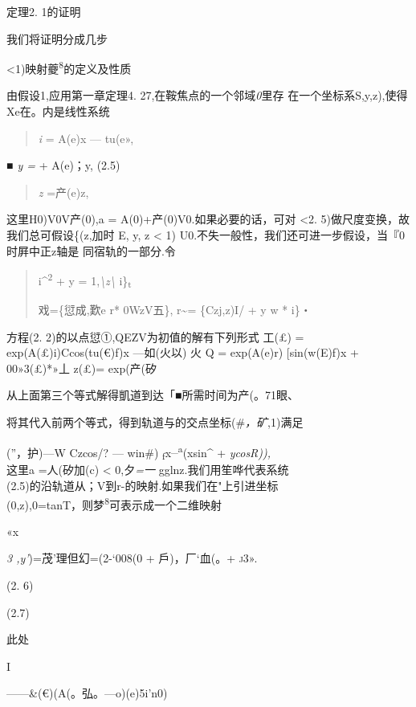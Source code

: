\documentclass{article}
\begin{document}
定理2. 1的证明

我们将证明分成几步

\textless{}1)映射夔\textsuperscript{8}的定义及性质

由假设1,应用第一章定理4. 27,在鞍焦点的一个邻域\emph{0}里存
在一个坐标系S,y,z),使得Xe在。内是线性系统

\begin{quote}
\emph{i} = A(e)x --- tu(e»,
\end{quote}

\emph{■ y =} + A(e)；y, (2.5)

\begin{quote}
\emph{z} =产(e)z,
\end{quote}

这里H0)V0V产(0),a = A(0)+产(0)V0.如果必要的话，可对 \textless{}2.
5)做尺度变换，故我们总可假设\{(z,加时\textbar{} E\textbar{},
\textbar{}y\textbar{}, \textbar{}z\textbar{} \textless{} 1)
U0.不失一般性，我们还可进一步假设，当『0时屛中正z轴是 同宿轨的一部分.令

\begin{quote}
i\^{}\textsuperscript{2} + y =
1,\emph{\textbackslash{}z\textbackslash{}} i\}\textsubscript{t}

戏=\{愆成,歎e r* \textbar{}0WzV五\}, r\textasciitilde{}= \{Czj,z)I/ + y
w * i\}・
\end{quote}

方程(2. 2)的以点愆①,QEZV为初值的解有下列形式 工(£) =
exp(A(£)i)Ccos(tu(€)f)x ---如(火以) 火 Q = exp(A(e)r) {[}sin(w(E)f)x +
00»3(£)*»丄 z(£)= exp(产(矽

从上面第三个等式解得凱道到达「■所需时间为产(。71眼、

将其代入前两个等式，得到轨道与的交点坐标(\#\emph{，矿},1)满足

(''，护)---W Czcos/? --- win\#)
\textsubscript{f}x\textsuperscript{\_a}(xsin\^{} + \emph{ycosR)),\\
}这里a =人(矽加(c) \textless{} 0,夕\emph{=一} gglnz.我们用笙哗代表系统\\
(2.5)的沿轨道从；V到r-的映射.如果我们在"上引进坐标\\
(0,z),0=tanT，则梦\textsuperscript{8}可表示成一个二维映射

«x

\emph{3 ,y'})=茂'理但幻=(2-`008(0 + 戶)，厂`血(。+ \textsc{j3».}

(2. 6)

(2.7)

此处

I

------\&(€)(A(。弘。---o)(e)5i'n0)
\end{document}
